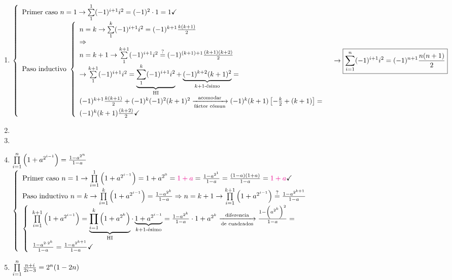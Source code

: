 \documentclass[12pt,a4paper, spanish]{article}
\begin{document}
\ejercicio
\begin{enumerate}[label=\roman*)]
	\item $\llave{ l }{
			      \text{Primer caso } n = 1 \to \sumatoria{1}{1} (-1)^{i+1} i^2 = (-1)^2 \cdot 1 = 1 \checkmark\\
			      \text{Paso inductivo }
			      \llave{ l }{
				      n = k \to \sumatoria{1}{k} (-1)^{i+1} i^2 = (-1)^{k+1} \frac{k(k+1)}{2} \\
				      \entonces\\
				      n = k+1 \to \sumatoria{1}{k+1}  (-1)^{i+1} i^2 \eq?= (-1)^{(k+1)+1} \frac{(k+1)(k+2)}{2}\\
				      \to \sumatoria{1}{k+1}  (-1)^{i+1} i^2 = \HI{ \sumatoria{1}{k} (-1)^{i+1} i^2 } + \kmasuno{(-1)^{k+2} (k+1)^2 } =\\
				      (-1)^{k+1} \frac{k(k+1)}{2} + (-1)^k (-1)^2 (k+1)^2 \flecha{acomodar}[fáctor cómun] (-1)^k (k+1)\left[ -\frac{k}{2} + (k+1) \right] =\\
				      (-1)^k (k+1)\frac{(k+2)}{2} \checkmark
			      }
		      }\\ \to
		      \boxed{\sumatoria{i=1}{n} (-1)^{i+1} i^2 = (-1)^{n+1} \frac{n(n+1)}{2}}
	      $

	\item
	      \hacer

	\item
	      \hacer

	\item
	      $\prod\limits_{i=1}^{n} \left(  1 + a^{2^{i-1}}  \right) = \frac{1-a^{2^n}}{1-a}$\\
	      $\llave{l}{
		      \text{Primer caso } n = 1 \to \productoria{i=1}{1} \parentesis{ 1 + a^{2^{i-1}} } = 1 + a^{2^0} = \magenta{$1 + a$} = \frac{1-a^{2^1}}{1 - a} = \frac{(1-a)(1+a)}{1-a} = \magenta{$1 + a$} \checkmark \\
		      \text{Paso inductivo } n = k \to \productoria{i=1}{k} \parentesis{ 1 + a^{2^{i-1}} } = \frac{1-a^{2^k}}{1-a} \entonces n = k+1 \to  \productoria{i=1}{k+1} \parentesis{ 1 + a^{2^{i-1}} } \eq?= \frac{1-a^{2^{k+1}}}{1-a}\\
		      \llave{l}{
		      \productoria{i=1}{k+1} \parentesis{ 1 + a^{2^{i-1}} } =
		      \HI{ \productoria{i=1}{k} \parentesis{ 1 + a^{2^k}}}   \cdot \kmasuno{ 1 + a^{2^{i-1}}}  =
		      \frac{1-a^{2^k}}{1-a} \cdot 1 + a^{2^k} \flecha{diferencia}[de cuadrados] \frac{1 - \parentesis{ a^{2^k}}^2}{1-a} =\\
		      \frac{1 - a^{2 \cdot 2^k}}{1-a} = \frac{1 - a^{2^{k+1}}}{1-a}\checkmark
		      }
		      }
	      $



	\item $\prod\limits_{i=1}^{n} \frac{n+i}{2i-3} = 2^n (1 -2n)$\\

\end{enumerate}
\end{document}
